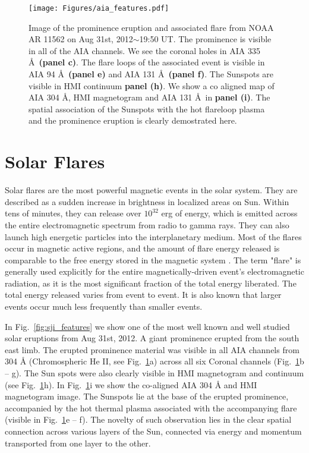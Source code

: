 \begin{figure}[ht!]
    \centering
    \texttt{[image: Figures/aia\_features.pdf]}
    \caption{Image of the prominence eruption and associated flare from NOAA AR 11562 on Aug 31st, 2012$\sim$19:50 UT. The prominence is visible in all of the AIA channels. We see the coronal holes in AIA 335 \AA~\textbf{(panel c)}. The flare loops of the associated event is visible in AIA 94 \AA~\textbf{(panel e)} and AIA 131 \AA~\textbf{(panel f)}. The Sunspots are visible in HMI continuum \textbf{panel (h)}. We show a co aligned map of AIA 304 \AA, HMI magnetogram and AIA 131 \AA~in \textbf{panel (i)}. The spatial association of the Sunspots with the hot flareloop plasma and the prominence eruption is clearly demostrated here. }
    \label{fig:aia-feature}
\end{figure}




\section{Solar Flares}\label{sol_flr}

Solar flares are the most powerful magnetic events in the solar system. They are described as a sudden increase in brightness in localized areas on Sun. Within tens of minutes, they can release over $10^{32}$ erg of energy, which is emitted across the entire electromagnetic spectrum from radio to gamma rays. They can also launch high energetic particles into the interplanetary medium. Most of the flares occur in magnetic active regions, and the amount of flare energy released is comparable to the free energy stored in the magnetic system \citep{emslie12,ash17}. The term "flare" is generally used explicitly for the entire magnetically-driven event's electromagnetic radiation, as it is the most significant fraction of the total energy liberated. The total energy released varies from event to event. It is also known that larger events occur much less frequently than smaller events.

In Fig.~\ref{fig:sji_features} we show one of the most well known and well studied solar eruptions from Aug 31st, 2012. A giant prominence erupted from the south east limb. The erupted prominence material was visible in all AIA channels from 304 {\AA} (Chromospheric He II, see Fig.~\ref{fig:aia-feature}a) across all six Coronal channels (Fig.~\ref{fig:aia-feature}b {--} g). The Sun spots were also clearly visible in HMI magnetogram and continuum (see Fig.~\ref{fig:aia-feature}h). In Fig.~\ref{fig:aia-feature}i we show the co-aligned AIA 304 {\AA} and HMI magnetogram image. The Sunspots lie at the base of the erupted prominence, accompanied by the hot thermal plasma associated with the accompanying flare (visible in Fig.~\ref{fig:aia-feature}e {--} f). The novelty of such observation lies in the clear spatial connection across various layers of the Sun, connected via energy and momentum transported from one layer to the other.

